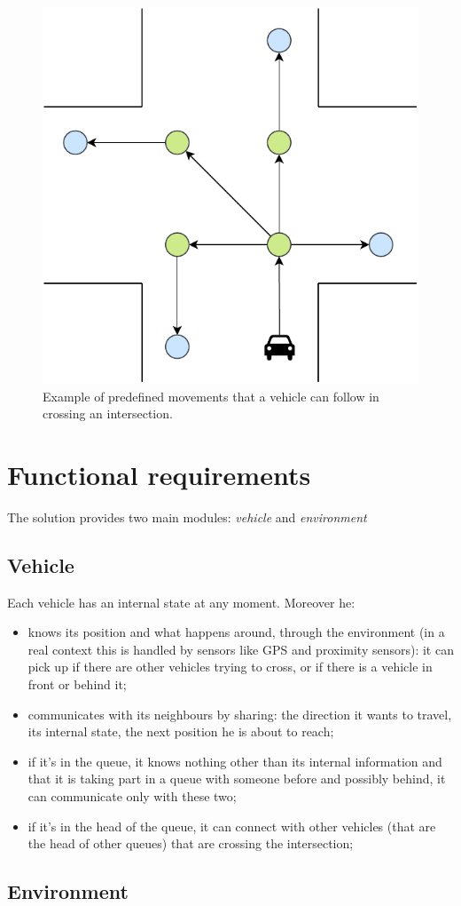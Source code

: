 \documentclass{memoir}
\begin{document}
\begin{figure}
	\centering
	\includegraphics[width=0.4\linewidth]{intersection_graph.pdf}
	\caption{Example of predefined movements that a vehicle can follow in crossing an intersection.}
	\label{fig:intersection-graph}
\end{figure}

\section{Functional requirements}
The solution provides two main modules: \emph{vehicle} and \emph{environment}

\subsection{Vehicle}
Each vehicle has an internal state at any moment. Moreover he:

\begin{itemize}
	\item knows its position and what happens around, through the environment (in a real context this is handled by sensors like GPS and proximity sensors): it can pick up if there are other vehicles trying to cross, or if there is a vehicle in front or behind it;
	\item communicates with its neighbours by sharing: the direction it wants to travel, its internal state, the next position he is about to reach;
	\item if it's in the queue, it knows nothing other than its internal information and that it is taking part in a queue with someone before and possibly behind, it can communicate only with these two;
	\item if it's in the head of the queue, it can connect with other vehicles (that are the head of other queues) that are crossing the intersection;
\end{itemize}

\subsection{Environment}
\end{document}

